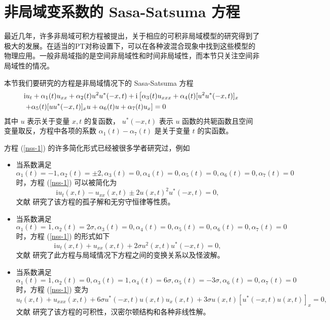 \chapter{非局域变系数的  Sasa-Satsuma 方程}
最近几年，许多非局域可积方程被提出，关于相应的可积非局域模型的研究得到了极大的发展。在适当的PT对称设置下，可以在各种波混合现象中找到这些模型的物理应用。一般非局域指的是空间非局域性和时间非局域性，而本节只关注空间非局域性的情况。

本节我们要研究的方程是非局域情况下的 Sasa-Satsuma 方程
\begin{align}
& \mathrm{i}u_{t} + \alpha_1(t) u_{xx} + \alpha_2(t)u^2u^*(-x,t) + \mathrm{i}\left[\alpha_3(t)u_{xxx} + \alpha_{4}(t)[u^{2}u^*(-x,t)]_{x}  \right. \notag\\
& \left. + \alpha_{5}(t)[uu^*(-x,t)]_{x}u + \alpha_{6}(t)u + \alpha_{7}(t)u_x\right] = 0 \label{nss-1}
\end{align}
其中 $u$ 表示关于变量 $x, t$ 的复函数， $u^*(-x,t)$ 表示 $u$ 函数的共轭函数且空间变量取反，方程中各项的系数 $\alpha_1(t) - \alpha_7(t)$ 是关于变量 $t$ 的实函数。

方程 (\ref{nss-1}) 的许多简化形式已经被很多学者研究过，例如
\begin{itemize}
  \item 当系数满足 $\alpha_1(t)=-1, \alpha_2(t)=\pm 2, \alpha_3(t)=0, \alpha_4(t)=0, \alpha_5(t)=0, \alpha_6(t) = 0, \alpha_7(t) = 0$ 时，方程 (\ref{nss-1}) 可以被简化为
      \begin{equation}
        \mathrm{i}u_t(x,t) - u_{xx}(x,t) \pm 2u(x,t)^2u^*(-x,t) = 0,
      \end{equation}
      文献 \cite{nss-1} 研究了该方程的孤子解和无穷守恒律等性质。
  \item 当系数满足 $\alpha_1(t)=1, \alpha_2(t)=2\sigma, \alpha_3(t)=0, \alpha_4(t)=0, \alpha_5(t)=0, \alpha_6(t) = 0, \alpha_7(t)= 0$ 时，方程 (\ref{nss-1}) 的形式如下
      \begin{equation}
         \mathrm{i}u_t(x,t) + u_{xx}(x,t) + 2\sigma u^2(x,t)u^*(-x,t) = 0,
      \end{equation}
      文献 \cite{nss-2} 研究了此方程与局域情况下方程之间的变换关系以及怪波解。
  \item 当系数满足 $\alpha_1(t)=1, \alpha_2(t)=0, \alpha_3(t)=1, \alpha_4(t)=6\sigma, \alpha_5(t)=-3\sigma, \alpha_6(t) = 0, \alpha_7(t) = 0$ 时，方程 (\ref{nss-1}) 变为
      \begin{equation}
        u_t(x,t) + u_{xxx}(x,t) + 6\sigma u^*(-x,t)u(x,t)u_x(x,t) + 3\sigma u(x,t)[u^*(-x,t)u(x,t)]_x = 0,
      \end{equation}
      文献 \cite{nss-3} 研究了该方程的可积性，汉密尔顿结构和各种非线性解。
\end{itemize}

